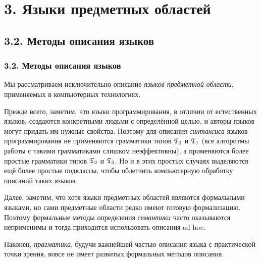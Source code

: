 \documentclass[mathserif,12pt,aspectratio=169]{beamer}
\def\emразделенной{\em разделенной}
\def\em#1{\it\color{blue}#1}
\begin{document}
\section{3. Языки предметных областей}

\subsection{3.2. Методы описания языков}\label{3.2.}
\begin{frame}
\frametitle{3.2. Методы описания языков}
Мы рассматриваем исключительно
описание {\em языков предметной области}, применяемых в компьютерных
технологиях. 

\smallskip
Прежде всего, заметим, что языки программирования, в
отличии от естественных языков, создаются конкретными людьми с
определённой целью, и авторы языков могут придать им нужные
свойства. Поэтому для описания {\em синтаксиса} языков
программирования не применяются грамматики типов $\frak{T}_0$ и $\frak{T}_1$
(все алгоритмы работы с такими грамматиками
 слишком неэффективны), а применяются более простые грамматики
типов $\frak{T}_2$ и $\frak{T}_3$. Но и в этих простых случаях
выделяются ещё более простые подклассы, чтобы облегчить
компьютерную обработку описаний таких языков.


\smallskip
Далее, заметим, что хотя языки предметных областей
являются формальными языками, но сами предметные области
редко имеют готовую формализацию. Поэтому формальные 
методы определения {\em семантики} часто оказываются неприменимы
и тогда приходится использовать описания ad hoc.

\medskip
Наконец, {\em прагматика}, будучи важнейшей частью 
описания языка с практической точки зрения,
вовсе не имеет развитых формальных методов описания.


\end{frame}
\end{document}
